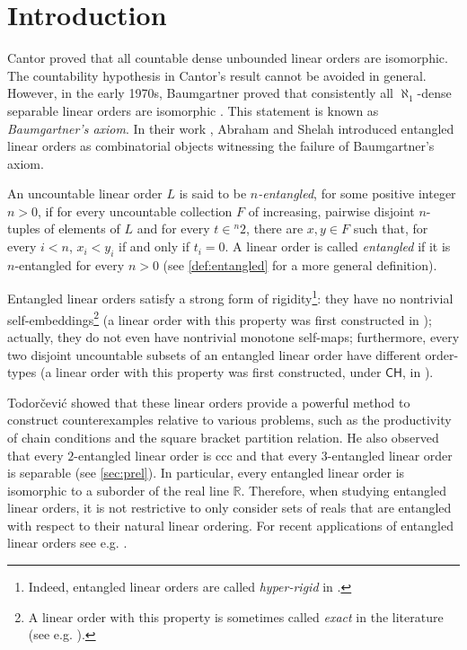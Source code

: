 \documentclass[12pt]{amsart}
\theoremstyle{definition}
\theoremstyle{remark}
\begin{document}
\maketitle


\section{Introduction}

Cantor proved that all countable dense unbounded linear orders are isomorphic. The countability hypothesis in Cantor's result cannot be avoided in general. However, in the early 1970s, Baumgartner proved that consistently all $\aleph_1$-dense separable linear orders are isomorphic \cite{MR317934}. This statement is known as \emph{Baumgartner's axiom}. In their work \cite{avraham1981martin}, Abraham and Shelah introduced entangled linear orders as combinatorial objects witnessing the failure of Baumgartner's axiom.

An uncountable linear order $L$ is said to be \emph{$n$-entangled}, for some positive integer $n > 0$,
if for every uncountable collection $F$ of increasing, pairwise disjoint $n$-tuples of elements of $L$ and for every $t \in {}^n 2$,
there are $x, y \in F$ such that, for every $i < n$, $x_i < y_i$ if and only if $t_i = 0$.
A linear order is called \emph{entangled} if it is $n$-entangled for every $n > 0$ (see \cref{def:entangled} for a more general definition). 


Entangled linear orders satisfy a strong form of rigidity\footnote{Indeed, entangled linear orders are called \emph{hyper-rigid} in \cite{MR776283}.}: they have no nontrivial self-embeddings\footnote{A linear order with this property is sometimes called \emph{exact} in the literature (see e.g. \cite{MR70683, MR95131}).} (a linear order with this property was first constructed in \cite{MR1919}); actually, they do not even have nontrivial monotone self-maps; furthermore, every two disjoint uncountable subsets of an entangled linear order have different order-types (a linear order with this property was first constructed, under $\mathsf{CH}$, in \cite{MR4862}).



Todor{\v c}evi{\'c} \cite{MR799818} showed that these linear orders provide a powerful method to construct counterexamples relative to various problems,
such as the productivity of chain conditions and the square bracket partition relation. He also observed that every $2$-entangled linear order is ccc and that every $3$-entangled linear order is separable (see \cref{sec:prel}). In particular, every entangled linear order is isomorphic to a suborder of the real line $\mathbb{R}$. Therefore, when studying entangled linear orders, it is not restrictive to only consider sets of reals that are entangled with respect to their natural linear ordering. For recent applications of entangled linear orders see e.g. \cite{MR3385104, MR4128471, MR4819970, MR4646731}.
\end{document}
